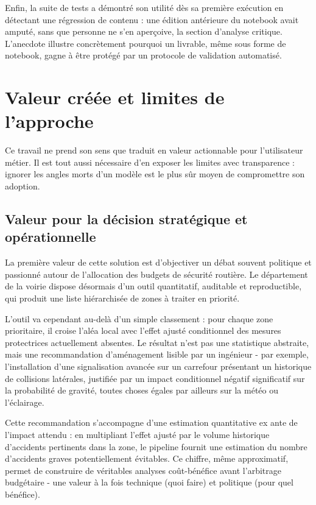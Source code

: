 \documentclass[12pt, a4paper]{article}
\begin{document}
Enfin, la suite de tests a démontré son utilité dès sa première exécution en détectant une régression de contenu : une édition antérieure du notebook avait amputé, sans que personne ne s'en aperçoive, la section d'analyse critique. L'anecdote illustre concrètement pourquoi un livrable, même sous forme de notebook, gagne à être protégé par un protocole de validation automatisé.

\section{Valeur créée et limites de l'approche}

Ce travail ne prend son sens que traduit en valeur actionnable pour l'utilisateur métier. Il est tout aussi nécessaire d'en exposer les limites avec transparence : ignorer les angles morts d'un modèle est le plus sûr moyen de compromettre son adoption.

\subsection{Valeur pour la décision stratégique et opérationnelle}

La première valeur de cette solution est d'objectiver un débat souvent politique et passionné autour de l'allocation des budgets de sécurité routière. Le département de la voirie dispose désormais d'un outil quantitatif, auditable et reproductible, qui produit une liste hiérarchisée de zones à traiter en priorité.

L'outil va cependant au-delà d'un simple classement : pour chaque zone prioritaire, il croise l'aléa local avec l'effet ajusté conditionnel des mesures protectrices actuellement absentes. Le résultat n'est pas une statistique abstraite, mais une recommandation d'aménagement lisible par un ingénieur - par exemple, l'installation d'une signalisation avancée sur un carrefour présentant un historique de collisions latérales, justifiée par un impact conditionnel négatif significatif sur la probabilité de gravité, toutes choses égales par ailleurs sur la météo ou l'éclairage.

Cette recommandation s'accompagne d'une estimation quantitative ex ante de l'impact attendu : en multipliant l'effet ajusté par le volume historique d'accidents pertinents dans la zone, le pipeline fournit une estimation du nombre d'accidents graves potentiellement évitables. Ce chiffre, même approximatif, permet de construire de véritables analyses coût-bénéfice avant l'arbitrage budgétaire - une valeur à la fois technique (quoi faire) et politique (pour quel bénéfice).
\end{document}
